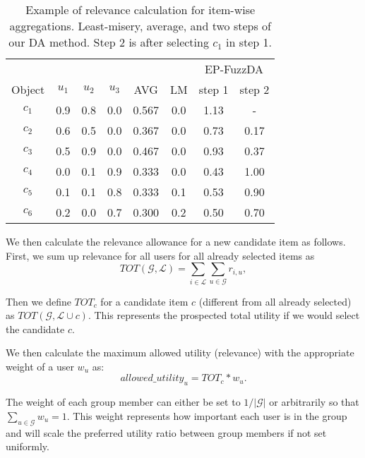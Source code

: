 \begin{table}[!ht]
    \centering
    \begin{tabular}{c | c c c | c c c c}
               &       &       &       &      &    & \multicolumn{2}{c}{EP-FuzzDA} \\
        Object & $u_1$ & $u_2$ & $u_3$ & AVG  & LM & step 1 & step 2\\
        \hline
        $c_1$ & 0.9 & 0.8 & 0.0 & 0.567 & 0.0 & 1.13 & - \\
        $c_2$ & 0.6 & 0.5 & 0.0 & 0.367 & 0.0 & 0.73 & 0.17 \\
        $c_3$ & 0.5 & 0.9 & 0.0 & 0.467 & 0.0 & 0.93 & 0.37 \\
        $c_4$ & 0.0 & 0.1 & 0.9 & 0.333 & 0.0 & 0.43 & 1.00 \\
        $c_5$ & 0.1 & 0.1 & 0.8 & 0.333 & 0.1 & 0.53 & 0.90 \\
        $c_6$ & 0.2 & 0.0 & 0.7 & 0.300 & 0.2 & 0.50  & 0.70 \\
    \end{tabular}
    \caption[Example of relevance calculation for item-wise aggregations]{Example of relevance calculation for item-wise aggregations. Least-misery, average, and two steps of our DA method. Step 2 is after selecting $c_1$ in step 1.}
    \label{table:6.2_relevance_example}
\end{table}


We then calculate the relevance allowance for a new candidate item as follows. First, we sum up relevance for all users for all already selected items as 
\begin{equation}
    TOT(\mathcal{G}, \mathcal{L}) = \sum_{i \in \mathcal{L}}\sum_{u\in \mathcal{G}} r_{i,u},
\end{equation}

Then we define $TOT_c$ for a candidate item $c$ (different from all already selected) as $TOT(\mathcal{G}, \mathcal{L} \cup c)$. This represents the prospected total utility if we would select the candidate $c$.




We then calculate the maximum allowed utility (relevance) with the appropriate weight of a user $w_u$ as:
\begin{equation}
    allowed\_utility_u = TOT_c * w_u.
\end{equation}

The weight of each group member can either be set to $1/|\mathcal{G}|$ or arbitrarily so that $\sum_{u \in \mathcal{G}} w_u = 1$. This weight represents how important each user is in the group and will scale the preferred utility ratio between group members if not set uniformly.

